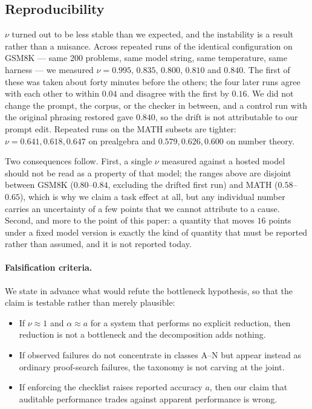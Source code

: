 \documentclass[11pt,a4paper]{article}
\begin{document}
\subsection{Reproducibility}
\label{sec:protocol-repro}
$\nu$ turned out to be less stable than we expected, and the instability is a
result rather than a nuisance.  Across repeated runs of the identical
configuration on GSM8K --- same 200 problems, same model string, same
temperature, same harness --- we measured $\nu = 0.995$, $0.835$, $0.800$,
$0.810$ and $0.840$.  The first of these was taken about forty minutes before the
others; the four later runs agree with each other to within $0.04$ and disagree
with the first by $0.16$.  We did not change the prompt, the corpus, or the
checker in between, and a control run with the original phrasing restored gave
$0.840$, so the drift is not attributable to our prompt edit.  Repeated runs on
the MATH subsets are tighter: $\nu = 0.641, 0.618, 0.647$ on prealgebra and
$0.579, 0.626, 0.600$ on number theory.

Two consequences follow.  First, a single $\nu$ measured against a hosted model
should not be read as a property of that model; the ranges above are disjoint
between GSM8K ($0.80$--$0.84$, excluding the drifted first run) and MATH
($0.58$--$0.65$), which is why we claim a task effect at all, but any individual
number carries an uncertainty of a few points that we cannot attribute to a
cause.  Second, and more to the point of this paper: a quantity that moves
$16$ points under a fixed model version is exactly the kind of quantity that
must be reported rather than assumed, and it is not reported today.

\paragraph{Falsification criteria.}
We state in advance what would refute the bottleneck hypothesis, so that the
claim is testable rather than merely plausible:
\begin{itemize}
  \item If $\nu \approx 1$ and $\alpha \approx a$ for a system that performs no
        explicit reduction, then reduction is not a bottleneck and the
        decomposition adds nothing.
  \item If observed failures do not concentrate in classes A--N but appear
        instead as ordinary proof-search failures, the taxonomy is not carving
        at the joint.
  \item If enforcing the checklist raises reported accuracy $a$, then our claim
        that auditable performance trades against apparent performance is wrong.
\end{itemize}
\end{document}
